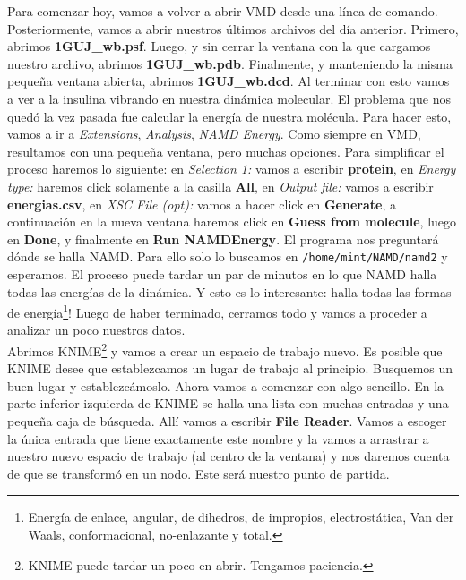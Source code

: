\documentclass[10pt,letterpaper]{article}
\newcommand{\inlinecode}[1]{
\colorbox{light-gray}{\texttt{#1}}
}
\begin{document}
Para comenzar hoy, vamos a volver a abrir VMD desde una l\'inea de comando. Posteriormente, vamos a abrir nuestros \'ultimos archivos del d\'ia anterior. Primero, abrimos \textbf{1GUJ\_wb.psf}. Luego, y sin cerrar la ventana con la que cargamos nuestro archivo, abrimos \textbf{1GUJ\_wb.pdb}. Finalmente, y manteniendo la misma peque\~na ventana abierta, abrimos \textbf{1GUJ\_wb.dcd}. Al terminar con esto vamos a ver a la insulina vibrando en nuestra din\'amica molecular. El problema que nos qued\'o la vez pasada fue calcular la energ\'ia de nuestra mol\'ecula. Para hacer esto, vamos a ir a \textit{Extensions}, \textit{Analysis}, \textit{NAMD Energy}. Como siempre en VMD, resultamos con una peque\~na ventana, pero muchas opciones. Para simplificar el proceso haremos lo siguiente: en \textit{Selection 1:} vamos a escribir \textbf{protein}, en \textit{Energy type:} haremos click solamente a la casilla \textbf{All}, en \textit{Output file:} vamos a escribir \textbf{energias.csv}, en \textit{XSC File (opt):} vamos a hacer click en \textbf{Generate}, a continuaci\'on en la nueva ventana haremos click en \textbf{Guess from molecule}, luego en \textbf{Done}, y finalmente en \textbf{Run NAMDEnergy}. El programa nos preguntar\'a d\'onde se halla NAMD. Para ello solo lo buscamos en \inlinecode{/home/mint/NAMD/namd2} y esperamos. El proceso puede tardar un par de minutos en lo que NAMD halla todas las energ\'ias de la din\'amica. Y esto es lo interesante: halla todas las formas de energ\'ia\footnote{Energ\'ia de enlace, angular, de dihedros, de impropios, electrost\'atica, Van der Waals, conformacional, no-enlazante y total.}! Luego de haber terminado, cerramos todo y vamos a proceder a analizar un poco nuestros datos.\\

Abrimos KNIME\footnote{KNIME puede tardar un poco en abrir. Tengamos paciencia.} y vamos a crear un espacio de trabajo nuevo. Es posible que KNIME desee que establezcamos un lugar de trabajo al principio. Busquemos un buen lugar y establezc\'amoslo. Ahora vamos a comenzar con algo sencillo. En la parte inferior izquierda de KNIME se halla una lista con muchas entradas y una peque\~na caja de b\'usqueda. All\'i vamos a escribir \textbf{File Reader}. Vamos a escoger la \'unica entrada que tiene exactamente este nombre y la vamos a arrastrar a nuestro nuevo espacio de trabajo (al centro de la ventana) y nos daremos cuenta de que se transform\'o en un nodo. Este ser\'a nuestro punto de partida.\\
\end{document}
